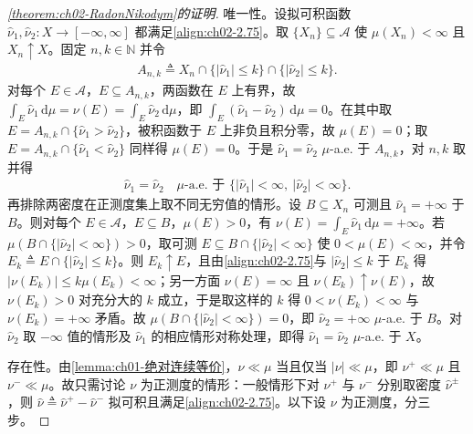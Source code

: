 \documentclass[../../main.tex]{subfiles}%
\begin{document}
\begin{proof}[\cref{theorem:ch02-RadonNikodym}的证明]
唯一性。设拟可积函数 $\hat\nu_1,\hat\nu_2:X\to[-\infty,\infty]$ 都满足\eqref{align:ch02-2.75}。取 $\{X_n\}\subseteq\mathscr A$ 使 $\mu(X_n)<\infty$ 且 $X_n\uparrow X$。固定 $n,k\in\mathbb N$ 并令
\begin{align*}
A_{n,k}\triangleq X_n\cap\{|\hat\nu_1|\leqslant k\}\cap\{|\hat\nu_2|\leqslant k\}.
\end{align*}
对每个 $E\in\mathscr A$，$E\subseteq A_{n,k}$，两函数在 $E$ 上有界，故 $\int_E\hat\nu_1\,\mathrm{d}\mu=\nu(E)=\int_E\hat\nu_2\,\mathrm{d}\mu$，即 $\int_E(\hat\nu_1-\hat\nu_2)\,\mathrm{d}\mu=0$。在其中取 $E=A_{n,k}\cap\{\hat\nu_1>\hat\nu_2\}$，被积函数于 $E$ 上非负且积分零，故 $\mu(E)=0$；取 $E=A_{n,k}\cap\{\hat\nu_1<\hat\nu_2\}$ 同样得 $\mu(E)=0$。于是 $\hat\nu_1=\hat\nu_2$ $\mu$-a.e. 于 $A_{n,k}$，对 $n,k$ 取并得
\begin{align*}
\hat\nu_1=\hat\nu_2\quad\mu\text{-a.e. 于 }\{|\hat\nu_1|<\infty,\ |\hat\nu_2|<\infty\}.
\end{align*}
再排除两密度在正测度集上取不同无穷值的情形。设 $B\subseteq X_n$ 可测且 $\hat\nu_1=+\infty$ 于 $B$。则对每个 $E\in\mathscr A$，$E\subseteq B$，$\mu(E)>0$，有 $\nu(E)=\int_E\hat\nu_1\,\mathrm{d}\mu=+\infty$。若 $\mu(B\cap\{|\hat\nu_2|<\infty\})>0$，取可测 $E\subseteq B\cap\{|\hat\nu_2|<\infty\}$ 使 $0<\mu(E)<\infty$，并令 $E_k\triangleq E\cap\{|\hat\nu_2|\leqslant k\}$。则 $E_k\uparrow E$，且由\eqref{align:ch02-2.75}与 $|\hat\nu_2|\leqslant k$ 于 $E_k$ 得 $|\nu(E_k)|\leqslant k\mu(E_k)<\infty$；另一方面 $\nu(E)=\infty$ 且 $\nu(E_k)\uparrow\nu(E)$，故 $\nu(E_k)>0$ 对充分大的 $k$ 成立，于是取这样的 $k$ 得 $0<\nu(E_k)<\infty$ 与 $\nu(E_k)=+\infty$ 矛盾。故 $\mu(B\cap\{|\hat\nu_2|<\infty\})=0$，即 $\hat\nu_2=+\infty$ $\mu$-a.e. 于 $B$。对 $\hat\nu_2$ 取 $-\infty$ 值的情形及 $\hat\nu_1$ 的相应情形对称处理，即得 $\hat\nu_1=\hat\nu_2$ $\mu$-a.e. 于 $X$。

存在性。由\cref{lemma:ch01-绝对连续等价}，$\nu\ll\mu$ 当且仅当 $|\nu|\ll\mu$，即 $\nu^+\ll\mu$ 且 $\nu^-\ll\mu$。故只需讨论 $\nu$ 为正测度的情形：一般情形下对 $\nu^+$ 与 $\nu^-$ 分别取密度 $\hat\nu^\pm$，则 $\hat\nu\triangleq\hat\nu^+-\hat\nu^-$ 拟可积且满足\eqref{align:ch02-2.75}。以下设 $\nu$ 为正测度，分三步。


\end{proof}
\end{document}
